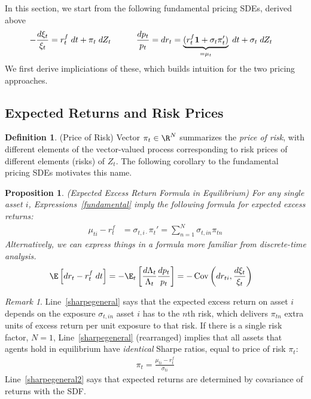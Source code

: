 \documentclass[12pt]{article}
\theoremstyle{plain}
\newtheorem{prop}[thm]{Proposition}
\theoremstyle{definition}
\newtheorem{defn}[thm]{Definition}
\theoremstyle{remark}
\newtheorem*{rmk}{Remark}
\newcommand{\Cov}{\operatorname{Cov}}
\begin{document}
In this section, we start from the following fundamental pricing SDEs,
derived above
\begin{align}
  -
  \frac{d\xi_t}{\xi_t}
  =
  r_t^f\;dt + \pi_t \;dZ_t
  \qquad
  \quad
  \frac{dp_t}{p_t}
  =
  dr_t
  &=
  \underbrace{%
    (r_t^f\mathbf{1}+\sigma_t\pi_t')
  }_{=\mu_t}
  \;dt
  +
  \sigma_t
  \;dZ_t
  \label{fundamental}
\end{align}
We first derive impliciations of these, which builds intuition for the
two pricing approaches.

\subsection{Expected Returns and Risk Prices}

\begin{defn}(Price of Risk)
Vector $\pi_t\in \R^N$ summarizes the \emph{price of risk}, with
different elements of the vector-valued process corresponding to risk
prices of different elements (risks) of $Z_t$.
The following corollary to the fundamental pricing SDEs motivates this
name.
\end{defn}


\begin{prop}\emph{(Expected Excess Return Formula in Equilibrium)}
For any single asset $i$, Expressions~\ref{fundamental} imply the
following formula for expected excess returns:
\begin{align}
  \mu_{ti}
  -r_t^f
  &=
  \sigma_{t,i\cdot}\pi_t'
  =
  \sum_{n=1}^N \sigma_{t,in}\pi_{tn}
  \label{sharpegeneral}
\end{align}
Alternatively, we can express things in a formula more familiar from
discrete-time analysis.
\begin{align}
  \E\left[ dr_t-r_t^f\;dt \right]
  &=
  - \E_t\left[
     \frac{d\Lambda_t}{\Lambda_t}\frac{dp_t}{p_t}
    \right]
  =
  -
  \Cov\left(dr_{ti},\frac{d\xi_t}{\xi_t}\right)
  \label{sharpegeneral2}
\end{align}
\end{prop}
\begin{rmk}
Line~\ref{sharpegeneral} says that the expected excess return on asset
$i$ depends on the exposure $\sigma_{t,in}$ asset $i$ has to the $n$th
risk, which delivers $\pi_{tn}$ extra units of excess return per unit
exposure to that risk.
If there is a single risk factor, $N=1$, Line~\ref{sharpegeneral}
(rearranged) implies that all assets that agents hold in equilibrium
have \emph{identical} Sharpe ratios, equal to price of risk $\pi_t$:
\begin{align*}
  \pi_t =
  \frac{\mu_{ti}-r_t^f}{\sigma_{ti}}
\end{align*}
Line~\ref{sharpegeneral2} says that expected returns are determined by
covariance of returns with the SDF.

\end{rmk}
\end{document}

